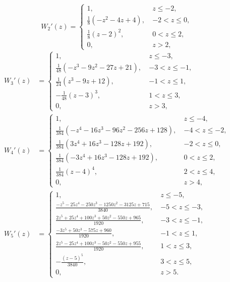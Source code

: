 {\begin{equation}\label{ch3:eq:W2'}
  W_2'(z)
  = 
    \begin{cases}
      1,\ & z\leq -2, \\
      \frac{1}{8} \left(-z^2-4 z+4\right),\ & -2<z\leq 0, \\
      \frac{1}{8} (z-2)^2,\ & 0<z\leq 2, \\
      0,\ & z > 2,
    \end{cases}
\end{equation}
\begin{align*}
W_3'(z)
  &= 
    \begin{cases}
      1,\ & z\leq -3, \\
      \frac{1}{48} \left(-z^3-9 z^2-27 z+21\right),\ & -3<z\leq -1, \\
      \frac{1}{24} \left(z^3-9 z+12\right),\ & -1<z\leq 1, \\
      -\frac{1}{48} (z-3)^3,\ & 1<z\leq 3, \\
      0,\ & z > 3,
    \end{cases}\\
  W_4'(z)
  &=
    \begin{cases}
      1,\ & z\leq -4, \\
      \frac{1}{384} \left(-z^4-16 z^3-96 z^2-256 z+128\right),\ & -4<z\leq -2, \\
      \frac{1}{384} \left(3 z^4+16 z^3-128 z+192\right),\ & -2<z\leq 0, \\
      \frac{1}{384} \left(-3 z^4+16 z^3-128 z+192\right),\ & 0<z\leq 2, \\
      \frac{1}{384} (z-4)^4,\ & 2<z\leq 4, \\
      0,\ & z > 4,
    \end{cases}\\
  W_5'(z)
  &=
    \begin{cases}
      1,\ & z\leq -5, \\
      \frac{-z^5-25 z^4-250 z^3-1250 z^2-3125 z+715}{3840},\ & -5<z\leq -3, \\
      \frac{2 z^5+25 z^4+100 z^3+50 z^2-550 z+965}{1920},\ & -3<z\leq -1, \\
      \frac{-3 z^5+50 z^3-575 z+960}{1920},\ & -1<z\leq 1, \\
      \frac{2 z^5-25 z^4+100 z^3-50 z^2-550 z+955}{1920},\ & 1<z\leq 3, \\
      -\frac{(z-5)^5}{3840},\ & 3<z\leq 5, \\
      0,\ & z > 5.
    \end{cases}
\end{align*}

}
